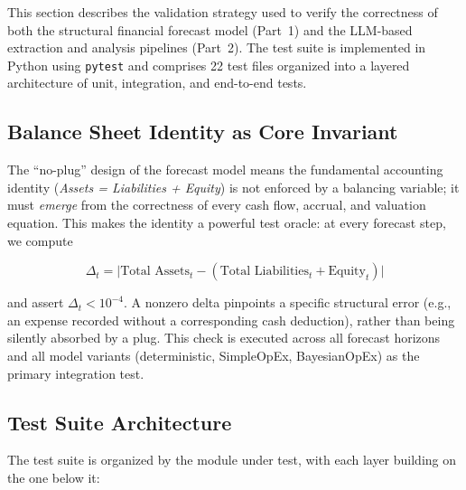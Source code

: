 \documentclass[12pt,a4paper]{article}
\begin{document}
This section describes the validation strategy used to verify the
correctness of both the structural financial forecast model (Part~1) and
the LLM-based extraction and analysis pipelines (Part~2). The test suite
is implemented in Python using \texttt{pytest} and comprises 22 test
files organized into a layered architecture of unit, integration, and
end-to-end tests.

\subsection{Balance Sheet Identity as Core Invariant}

The ``no-plug'' design of the forecast model means the fundamental
accounting identity (\emph{Assets = Liabilities + Equity}) is not
enforced by a balancing variable; it must \emph{emerge} from the
correctness of every cash flow, accrual, and valuation equation. This
makes the identity a powerful test oracle: at every forecast step, we
compute

\[
\Delta_t = \lvert \text{Total Assets}_t - (\text{Total Liabilities}_t + \text{Equity}_t) \rvert
\]

and assert $\Delta_t < 10^{-4}$. A nonzero delta pinpoints a specific
structural error (e.g., an expense recorded without a corresponding cash
deduction), rather than being silently absorbed by a plug. This check is
executed across all forecast horizons and all model variants
(deterministic, SimpleOpEx, BayesianOpEx) as the primary integration
test.

\subsection{Test Suite Architecture}

The test suite is organized by the module under test, with each layer
building on the one below it:
\end{document}
